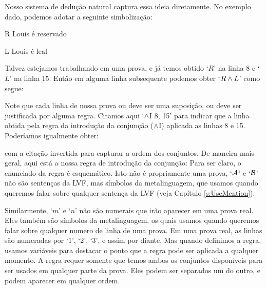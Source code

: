 Nosso sistema de dedu\c c\~ao natural  captura  essa ideia diretamente. No exemplo dado, podemos adotar a seguinte simboliza\c c\~ao:
	\begin{ekey}
		\item[R] Louis \'e reservado
		\item[L] Louis \'e leal
	\end{ekey}
 Talvez estejamos trabalhando em uma prova, e j\'a temos obtido `$R$'  na linha 8 e `$L$' na linha 15. Ent\~ao  em alguma linha subsequente podemos obter  `$R \wedge L$' como segue:
\begin{fitchproof}
	 
\end{fitchproof}

 Note que cada linha de nossa prova  ou deve ser uma suposi\c c\~ao, ou deve ser justificada por alguma regra.    Citamos  aqui   `$\wedge$I 8, 15' para indicar que a linha obtida pela regra da introdu\c c\~ao  da conjun\c c\~ao  ($\wedge$I) aplicada as linhas 8 e 15.  Poder\'iamos igualmente obter:
\begin{fitchproof}
	 
\end{fitchproof}
 
 com a cita\c c\~ao invertida para capturar a ordem  dos  conjuntos. 
De maneira mais geral, aqui est\'a  a nossa regra de introdu\c c\~ao da  conjun\c c\~ao:
Para ser claro, o enunciado da regra \'e esquem\'atico.  Isto n\~ao \'e propriamente uma prova,      `$\mathcal{A}$'  e `$\mathcal{B}$'  n\~ao s\~ao senten\c cas da LVF, mas s\'imbolos da metalinguagem, que usamos quando queremos falar sobre qualquer sentença da LVF (veja Cap\'itulo \ref{s:UseMention}). 

Similarmente,  `$m$' e `$n$' n\~ao s\~ao numerais  que ir\~ao aparecer em uma prova real. Eles tamb\'em s\~ao s\'imbolos da metalinguagem, os quais usamos quando queremos falar sobre qualquer numero de linha  de uma prova. Em uma  prova real, as linhas  s\~ao numeradas por `$1$', `$2$', `$3$', e assim por diante.  Mas quando definimos a regra, usamos vari\'aveis   para destacar o ponto que a regra pode ser aplicada a qualquer momento.  A regra requer somente que temos ambos os conjuntos dispon\'iveis para ser usados em qualquer parte da prova. Eles podem ser separados um do outro, e podem aparecer em qualquer ordem.

